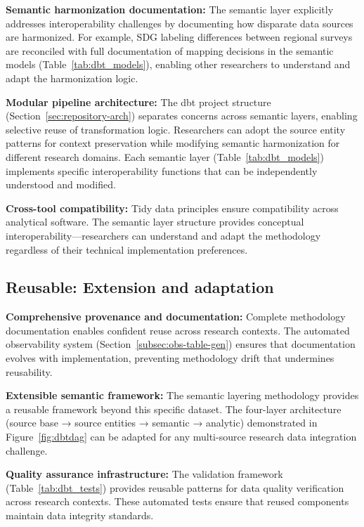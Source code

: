 \textbf{Semantic harmonization documentation:} The semantic layer explicitly addresses interoperability challenges by documenting how disparate data sources are harmonized. For example, SDG labeling differences between regional surveys are reconciled with full documentation of mapping decisions in the semantic models (Table~\ref{tab:dbt_models}), enabling other researchers to understand and adapt the harmonization logic.

\textbf{Modular pipeline architecture:} The dbt project structure (Section~\ref{sec:repository-arch}) separates concerns across semantic layers, enabling selective reuse of transformation logic. Researchers can adopt the source entity patterns for context preservation while modifying semantic harmonization for different research domains. Each semantic layer (Table~\ref{tab:dbt_models}) implements specific interoperability functions that can be independently understood and modified.

\textbf{Cross-tool compatibility:} Tidy data principles ensure compatibility across analytical software. The semantic layer structure provides conceptual interoperability—researchers can understand and adapt the methodology regardless of their technical implementation preferences.

\subsection{Reusable: Extension and adaptation}

\textbf{Comprehensive provenance and documentation:} Complete methodology documentation enables confident reuse across research contexts. The automated observability system (Section~\ref{subsec:obs-table-gen}) ensures that documentation evolves with implementation, preventing methodology drift that undermines reusability.

\textbf{Extensible semantic framework:} The semantic layering methodology provides a reusable framework beyond this specific dataset. The four-layer architecture (source base → source entities → semantic → analytic) demonstrated in Figure~\ref{fig:dbtdag} can be adapted for any multi-source research data integration challenge.

\textbf{Quality assurance infrastructure:} The validation framework (Table~\ref{tab:dbt_tests}) provides reusable patterns for data quality verification across research contexts. These automated tests ensure that reused components maintain data integrity standards.

